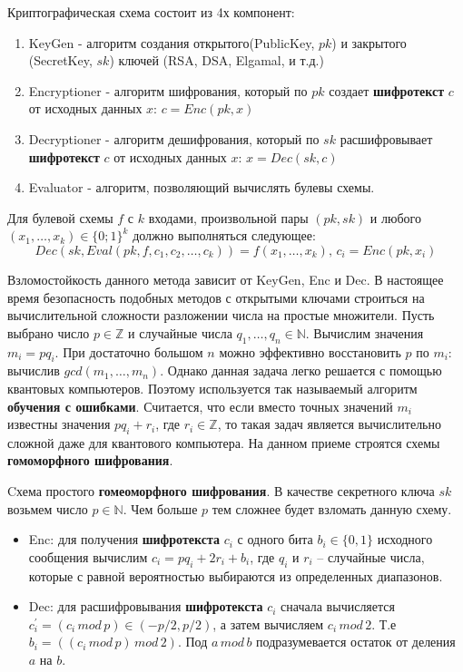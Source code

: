 Криптографическая схема состоит из 4х компонент:
\begin{enumerate}
	\item KeyGen - алгоритм создания открытого(PublicKey, $pk$) и закрытого (SecretKey, $sk$) ключей (RSA, DSA, Elgamal, и т.д.)
	\item Encryptioner - алгоритм шифрования, который по $pk$ создает \textbf{шифротекст} $c$ от исходных данных $x$: $c = Enc(pk, x)$
	\item Decryptioner - алгоритм дешифрования, который по $sk$ расшифровывает \textbf{шифротекст} $c$ от исходных данных $x$: $x = Dec(sk, c)$
	\item Evaluator - алгоритм, позволяющий вычислять булевы схемы.
\end{enumerate} 

Для булевой схемы $f$ с $k$ входами, произвольной пары $(pk, sk)$ и любого $(x_1, \dots, x_k) \in \{0;1\}^k$ должно выполняться следующее: $$Dec(sk, Eval(pk, f, c_1,c_2, \dots, c_k)) = f(x_1, \dots, x_k), \, c_i = Enc(pk, x_i)$$


Взломостойкость данного метода зависит от KeyGen, Enc и Dec. В настоящее время безопасность подобных методов с открытыми ключами строиться на вычислительной сложности разложении числа на простые множители. Пусть выбрано число $p \in \mathbb{Z}$ и случайные числа $q_1, \dots, q_n \in \mathbb{N}$. Вычислим значения $m_i=pq_i$. При достаточно большом $n$ можно эффективно восстановить $p$ по $m_i$: вычислив $gcd(m_1, \dots, m_n)$.  Однако данная задача легко решается с помощью квантовых компьютеров. Поэтому используется так называемый алгоритм \textbf{обучения с ошибками}. Считается, что если вместо точных значений $m_i$ известны значения $pq_i+r_i$, где $r_i \in \mathbb{Z}$, то такая задач является вычислительно сложной даже для квантового компьютера. На данном приеме строятся схемы \textbf{гомоморфного шифрования}.

Cхема простого \textbf{гомеоморфного шифрования}. В качестве секретного ключа $sk$ возьмем число $p \in \mathbb{N}$. Чем больше $p$ тем сложнее будет взломать данную схему.
\begin{itemize}
	\item Enc: для получения \textbf{шифротекста} $c_i$ с одного бита $b_i \in \{0, 1\}$ исходного сообщения вычислим $c_i = pq_i + 2r_i + b_i$, где $q_i$ и $r_i$ -- случайные числа, которые с равной вероятностью выбираются из определенных диапазонов.
	\item Dec: для расшифровывания \textbf{шифротекста} $c_i$ сначала вычисляется $c_i^{'} = (c_i \, mod \, p) \in (-p/2, p/2)$, а затем вычисляем $c_i \, mod \, 2$. Т.е $b_i = ((c_i \, mod \, p) \, mod \, 2)$. Под $a \, mod \, b $ подразумевается остаток от деления $a$ на $b$.
\end{itemize}



